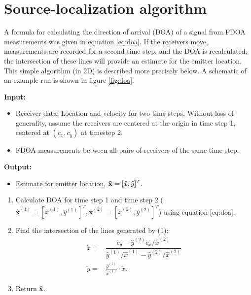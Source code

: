 \section{Source-localization algorithm}
\label{s:algorithm}
A formula for calculating the direction of arrival (DOA) of a signal from FDOA measurements was given in equation \ref{eq:doa}. If the receivers move, measurements are recorded for a second time step, and the DOA is recalculated, the intersection of these lines will provide an estimate for the emitter location. This simple algorithm (in 2D) is described more precisely below. A schematic of an example run is shown in figure \ref{fig:doa}.
\begin{framed}
\noindent\textbf{Input:}
\begin{itemize}
  \item Receiver data: Location and velocity for two time steps. Without loss of generality, assume the receivers are centered at the origin in time step 1, centered at $(c_x,c_y)$ at timestep 2.
  \item FDOA measurements between all pairs of receivers of the same time step.
\end{itemize}
\textbf{Output:}
\begin{itemize}
  \item Estimate for emitter location, $\tilde{\mathbf{x}}=[\tilde{x},\tilde{y}]^T.$
\end{itemize}

\begin{enumerate}
  \item Calculate DOA for time step 1 and time step 2 ($\hat{\mathbf{x}}^{(1)}=[\hat{x}^{(1)},\hat{y}^{(1)}]^T,\hat{\mathbf{x}}^{(2)}=[\hat{x}^{(2)},\hat{y}^{(2)}]^T$) using equation \ref{eq:doa}.
  \item Find the intersection of the lines generated by (1):
  \begin{align*}
    \tilde{x} =& \dfrac{c_y - \hat{y}^{(2)}c_x/\hat{x}^{(2)}}{\hat{y}^{(1)}/\hat{x}^{(1)}-\hat{y}^{(2)}/\hat{x}^{(2)}} \\
    \tilde{y} =& \frac{\hat{y}^{(1)}}{\hat{x}^{(1)}}\cdot\tilde{x}.
  \end{align*}
  \item Return $\tilde{\mathbf{x}}.$
\end{enumerate}
\end{framed}
